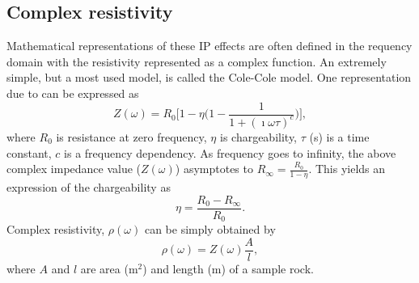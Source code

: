 \documentclass[letterpaper,11pt]{article}
\begin{document}

\subsection{Complex resistivity}

Mathematical representations of these IP effects are often defined in the requency domain with the resistivity represented as a complex function.
An extremely simple, but a most used model, is called the Cole-Cole model. One representation due to  \cite{Pelton1978} can be expressed as 
\begin{equation}
  Z(\omega) = R_0 \Big[1 - \eta \Big(1-\frac{1}{1+(\imath\omega\tau)^c}\Big) \Big],
  \label{eq:colecole}
\end{equation}
where $R_0$ is resistance at zero frequency, $\eta$ is chargeability, $\tau$ (s) is a time constant, $c$ is a frequency dependency. As frequency goes to infinity, the above complex impedance value ($Z(\omega)$) asymptotes to $R_{\infty} = \frac{R_0}{1-\eta}$. This yields an expression of the chargeability as 
\begin{equation}
  \eta = \frac{R_0-R_{\infty}}{R_0}.
\end{equation}
Complex resistivity, $\rho(\omega)$ can be simply obtained by 
\begin{equation}
  \rho(\omega) = Z(\omega)\frac{A}{l},
\end{equation}
where $A$ and $l$ are area (m$^2$) and length (m) of a sample rock. 

\end{document}
